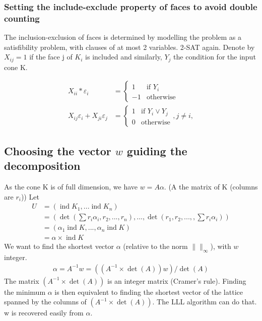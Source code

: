 \documentclass[14pt]{article}
\newcommand{\ind}{\mathop{\mathrm{ind}}}
\begin{document}
\subsubsection*{Setting the include-exclude property of faces to avoid double counting}
The inclusion-exclusion of faces is determined by modelling the problem as a satisfibility problem, with clauses of at most 2 variables. 2-SAT again.
Denote by $X_{ij}=1$ if the face j of $K_i$ is included and similarly, $Y_j$ the condition for the input cone K.

  \begin{align*}
    X_{ii} * \varepsilon_i &= 
    \begin{cases}
      1 & \text{if $Y_i$}\\
      -1 & \text{otherwise}
    \end{cases} \\
    X_{ij} \varepsilon_i + X_{ji} \varepsilon_j &= 
    \begin{cases}
      1 & \text{if }Y_i \vee Y_j \\
      0 & \text{otherwise}
    \end{cases}, j\neq i, 
  \end{align*}



\subsection*{Choosing the vector $w$ guiding the decomposition}

As the cone K is of full dimension, we have $w = A\alpha$. (A the matrix of K (columns are $r_i$))
Let 
\begin{align*}U &= (\ind K_1, ... \ind K_n) \\
  &= (\det(\sum r_i \alpha_i, r_2,...,r_n), ..., \det(r_1, r_2,...,, \sum r_i \alpha_i)) \\
  &= (\alpha_1 \ind K, ..., \alpha_n \ind K) \\
  &= \alpha \times \ind K
\end{align*}
We want to find the shortest vector $\alpha$ (relative to the norm $\|\|_{\infty}$), with $w$ integer.
\begin{align*}
\alpha = A^{-1} w = ((A^{-1} \times \det(A)) w) / \det(A)
\end{align*}
The matrix $(A^{-1} \times \det(A))$ is an integer matrix (Cramer's rule). Finding the minimum $\alpha$ is then equivalent to finding the shortest vector of the lattice spanned by the columns of $(A^{-1} \times \det(A))$. The LLL algorithm can do that.
w is recovered easily from $\alpha$.
\end{document}
